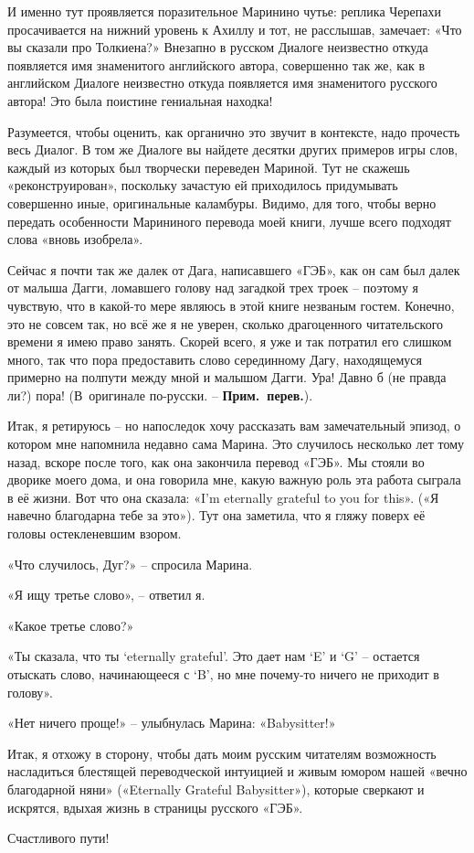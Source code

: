 \documentclass[../main.tex]{subfiles}
\begin{document}
И именно тут проявляется поразительное Маринино чутье: реплика Черепахи просачивается на нижний уровень к Ахиллу и тот, не расслышав, замечает: «Что вы сказали про Толкиена?» Внезапно в русском Диалоге неизвестно откуда появляется имя знаменитого английского автора, совершенно так же, как в английском Диалоге неизвестно откуда появляется имя знаменитого русского автора!
Это была поистине гениальная находка!

Разумеется, чтобы оценить, как органично это звучит в контексте, надо прочесть весь Диалог. В том же Диалоге вы найдете десятки других примеров игры слов, каждый из которых был творчески переведен Мариной. Тут не скажешь «реконструирован», поскольку зачастую ей приходилось придумывать совершенно иные, оригинальные каламбуры. Видимо, для того, чтобы верно передать особенности Марининого перевода моей книги, лучше всего подходят слова «вновь изобрела».

Сейчас я почти так же далек от Дага, написавшего «ГЭБ», как он сам был далек от малыша Дагги, ломавшего голову над загадкой трех троек \--- поэтому я чувствую, что в какой-то мере являюсь в этой книге незваным гостем. Конечно, это не совсем так, но всё же я не уверен, сколько драгоценного читательского времени я имею право занять. Скорей всего, я уже и так потратил его слишком много, так что пора предоставить слово серединному Дагу, находящемуся примерно на полпути между мной и малышом Дагги. Ура! Давно б (не правда ли?) пора! (В~оригинале по-русски. \--- \textbf{Прим.\ перев.}).

Итак, я ретируюсь \--- но напоследок хочу рассказать вам замечательный эпизод, о котором мне напомнила недавно сама Марина. Это случилось несколько лет тому назад, вскоре после того, как она закончила перевод «ГЭБ». Мы стояли во дворике моего дома, и она говорила мне, какую важную роль эта работа сыграла в её жизни. Вот что она сказала: «I'm eternally grateful to you for this». («Я навечно благодарна тебе за это»). Тут она заметила, что я гляжу поверх её головы остекленевшим взором.

«Что случилось, Дуг?» \--- спросила Марина.

«Я ищу третье слово», \--- ответил я.

«Какое третье слово?»

«Ты сказала, что ты \enquote*{eternally grateful}. Это дает нам \enquote*{E} и \enquote*{G} \--- остается отыскать слово, начинающееся с \enquote*{B}, но мне почему-то ничего не приходит в голову».

«Нет ничего проще!» \--- улыбнулась Марина: «Babysitter!»

Итак, я отхожу в сторону, чтобы дать моим русским читателям возможность насладиться блестящей переводческой интуицией и живым юмором нашей «вечно благодарной няни» («Eternally Grateful Babysitter»), которые сверкают и искрятся, вдыхая жизнь в страницы русского «ГЭБ».

\null

Счастливого пути!
\end{document}
